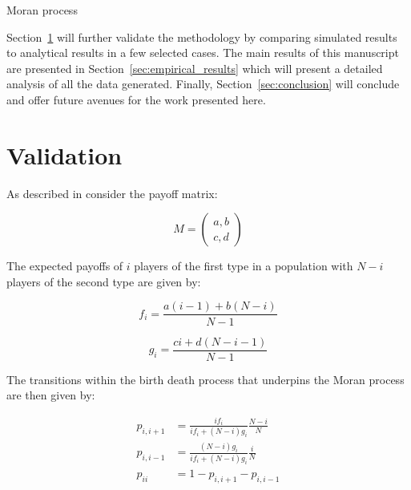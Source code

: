 \documentclass[10pt,journal]{IEEEtran}
\begin{document}
\begin{algorithm}[!hbtp]
        \caption{Moran process}
        \label{alg:moran_process}
        
\end{algorithm}

Section~\ref{sec:validation} will further validate the methodology by comparing
simulated results to analytical results in a few selected cases. The main 
results of this
manuscript are presented in Section~\ref{sec:empirical_results} which will
present a detailed analysis of all the data generated. Finally,
Section~\ref{sec:conclusion} will conclude and offer future avenues for the work
presented here.


\section{Validation}\label{sec:validation}

As described in \cite{Nowak} consider the payoff matrix:

\begin{equation}\label{equ:payoff_matrix}
    M = \begin{pmatrix}
        a, b\\
        c, d
        \end{pmatrix}
\end{equation}

The expected payoffs of \(i\) players of the first type in a population with \(N
- i\) players of the second type are given by:

\begin{equation}\label{equ:expected_payoff_one}
    f_i = \frac{a(i - 1) + b(N - i)}{N - 1}
\end{equation}

\begin{equation}\label{equ:expected_payoff_two}
    g_i = \frac{ci + d(N - i - 1)}{N - 1}
\end{equation}

The transitions within the birth death process that underpins the Moran process
are then given by:

\begin{align}
    p_{i, i+1}&= \frac{if_i}{if_i+(N-i)g_i}\frac{N-i}{N}\label{equ:p_up}\\
    p_{i, i-1}&= \frac{(N-i)g_i}{if_i+(N-i)g_i}\frac{i}{N}\label{equ:p_down}\\
    p_{ii} &= 1 - p_{i, i+1} - p_{i, i-1}\label{equ:p_stay}
\end{align}
\end{document}
